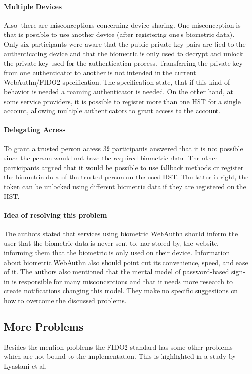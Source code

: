 \documentclass[runningheads]{llncs}
\begin{document}
\paragraph{Multiple Devices}
Also, there are misconceptions concerning device sharing. One misconception is that is possible to use another device (after registering one's biometric data). Only six participants were aware that the public-private key pairs are tied to the authenticating device and that the biometric is only used to decrypt and unlock the private key used for the authentication process. Transferring the private key from one authenticator to another is not intended in the current WebAuthn/FIDO2 specification. The specification state, that if this kind of behavior is needed a roaming authenticator is needed. On the other hand, at some service providers, it is possible to register more than one HST for a single account, allowing multiple authenticators to grant access to the account.

\paragraph{Delegating Access}
To grant a trusted person access 39 participants answered that it is not possible since the person would not have the required biometric data. The other participants argued that it would be possible to use fallback methods or register the biometric data of the trusted person on the used HST. The latter is right, the token can be unlocked using different biometric data if they are registered on the HST.

\paragraph{Idea of resolving this problem}
The authors stated that services using biometric WebAuthn should inform the user that the biometric data is never sent to, nor stored by, the website, informing them that the biometric is only used on their device. Information about biometric WebAuthn also should point out its convenience, speed, and ease of it. The authors also mentioned that the mental model of password-based sign-in is responsible for many misconceptions and that it needs more research to create notifications changing this model. They make no specific suggestions on how to overcome the discussed problems.

\subsection{More Problems} \label{ref1}
Besides the mention problems the FIDO2 standard has some other problems which are not bound to the implementation. This is highlighted in a study by Lyastani et al. \cite{9152694}
\end{document}
